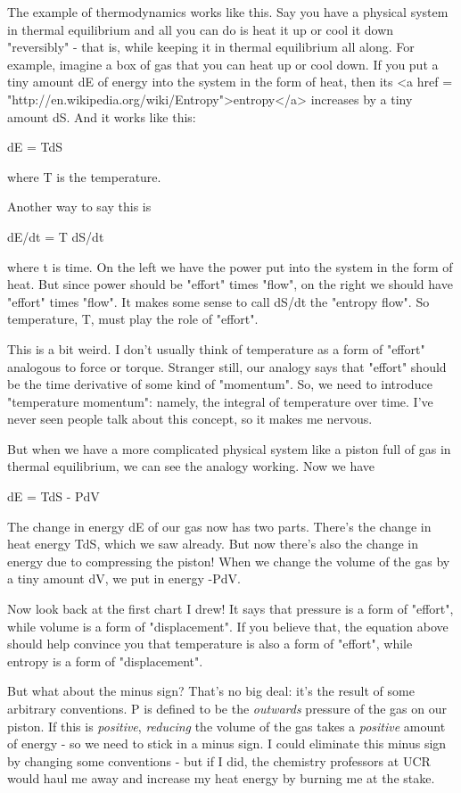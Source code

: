 The example of thermodynamics works like this.  Say you have a
physical system in thermal equilibrium and all you can do is heat it
up or cool it down "reversibly" - that is, while keeping
it in thermal equilibrium all along.  For example, imagine a box of gas
that you can heat up or cool down.  If you put a tiny amount dE of
energy into the system in the form of heat, then its <a href =
"http://en.wikipedia.org/wiki/Entropy">entropy</a> increases by a tiny
amount dS.  And it works like this:

dE = TdS

where T is the temperature.  

Another way to say this is

dE/dt = T dS/dt

where t is time.  On the left we have the power put into the system in
the form of heat.  But since power should be "effort" times
"flow", on the right we should have "effort" times
"flow".  It makes some sense to call dS/dt the "entropy
flow".  So temperature, T, must play the role of
"effort".

This is a bit weird.  I don't usually think of temperature as a form
of "effort" analogous to force or torque.  Stranger still,
our analogy says that "effort" should be the time derivative
of some kind of "momentum".  So, we need to introduce
"temperature momentum": namely, the integral of temperature
over time.  I've never seen people talk about this concept, so it
makes me nervous.

But when we have a more complicated physical system like a piston full
of gas in thermal equilibrium, we can see the analogy working.  Now
we have

dE = TdS - PdV

The change in energy dE of our gas now has two parts.  There's the
change in heat energy TdS, which we saw already.  But now there's
also the change in energy due to compressing the piston!  When we
change the volume of the gas by a tiny amount dV, we put in energy
-PdV.

Now look back at the first chart I drew!  It says that pressure is a
form of "effort", while volume is a form of
"displacement".  If you believe that, the equation above
should help convince you that temperature is also a form of
"effort", while entropy is a form of
"displacement".

But what about the minus sign?  That's no big deal: it's the result of
some arbitrary conventions.  P is defined to be the \emph{outwards}
pressure of the gas on our piston.  If this is \emph{positive},
\emph{reducing} the volume of the gas takes a \emph{positive}
amount of energy - so we need to stick in a minus sign.  I could
eliminate this minus sign by changing some conventions - but if I did,
the chemistry professors at UCR would haul me away and increase my
heat energy by burning me at the stake.

